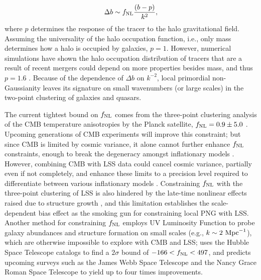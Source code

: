 \begin{equation}\label{eq:db}
\Delta b \sim f_{\rm NL} \frac{(b - p)}{k^{2}},
\end{equation}
where $p$ determines the response of the tracer to the halo gravitational field. Assuming the universality of the halo occupation function, i.e., only mass determines how a halo is occupied by galaxies, $p=1$. However, numerical simulations have shown the halo occupation distribution of tracers that are a result of recent mergers could depend on more properties besides mass, and thus $p=1.6$ \citep{slosar2008constraints}. Because of the dependence of $\Delta b$ on $k^{-2}$, local primordial non-Gaussianity leaves its signature on small wavenumbers (or large scales) in the two-point clustering of galaxies and quasars. 

The current tightest bound on $f_{\rm NL}$ comes from the three-point clustering analysis of the CMB temperature anisotropies by the Planck satellite, $f_{\rm NL}=0.9\pm 5.0$ \citep{akrami2019planck}. Upcoming generations of CMB experiments will improve this constraint; but since CMB is limited by cosmic variance, it alone cannot further enhance $f_{\rm NL}$ constraints, enough to break the degeneracy amongst inflationary models \citep[see, e.g.,][]{ade2019simons}. However, combining CMB with LSS data could cancel cosmic variance, partially even if not completely, and enhance these limits to a precision level required to differentiate between various inflationary models \citep[see, e.g.,][]{schmittfull2018PhRvD}. Constraining $f_{\rm NL}$ with the three-point clustering of LSS is also hindered by the late-time nonlinear effects raised due to structure growth \citep{baldauf2011galaxy, baldauf2011primordial}, and this limitation establishes the scale-dependent bias effect as the smoking gun for constraining local PNG with LSS. Another method for constraining $f_{\rm NL}$ employs UV Luminosity Function to probe galaxy abundances and structure formation on small scales (e.g., $k \sim 2~{\rm Mpc}^{-1}$), which are otherwise impossible to explore with CMB and LSS; \cite{sabti2021JCAP} uses the Hubble Space Telescope catalogs \citep{bouwens2015ApJ} to find a $2\sigma$ bound of $-166<f_{\rm NL}<497$, and predicts upcoming surveys such as the James Webb Space Telescope and the Nancy Grace Roman Space Telescope to yield up to four times improvements.


